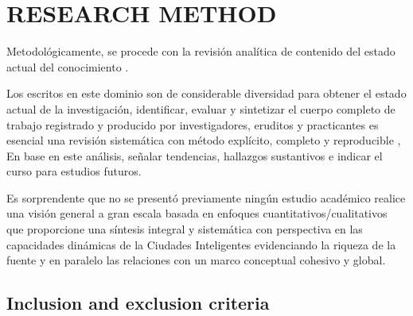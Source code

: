 \documentclass[a4paper,fleqn,spanish]{cas-dc}
\begin{document}
\section{RESEARCH METHOD}\label{metodo}

Metodológicamente, se procede con la revisión analítica de contenido del estado
actual del conocimiento \cite{kitchenham_guidelines_2007,
webster_analyzing_2002, Wolfswinkel2017}.


Los escritos en este dominio
son de considerable diversidad
para obtener el estado
actual de la investigación,
identificar, evaluar y sintetizar
el cuerpo completo de trabajo registrado y producido
por investigadores, eruditos y practicantes
es esencial
una revisión sistemática con método explícito, completo y reproducible
\cite{Okoli2015},
En base en este análisis,
señalar tendencias, hallazgos sustantivos
e indicar el curso para estudios futuros.

Es sorprendente que no se presentó previamente ningún estudio académico
realice una visión general a gran escala basada en enfoques
cuantitativos/cualitativos que proporcione una síntesis integral y sistemática
con perspectiva en las capacidades dinámicas de la Ciudades Inteligentes
evidenciando la riqueza de la fuente y en paralelo las relaciones con un
marco conceptual cohesivo y global.

 

\subsection{Inclusion and exclusion criteria}\label{criterio}
\end{document}
